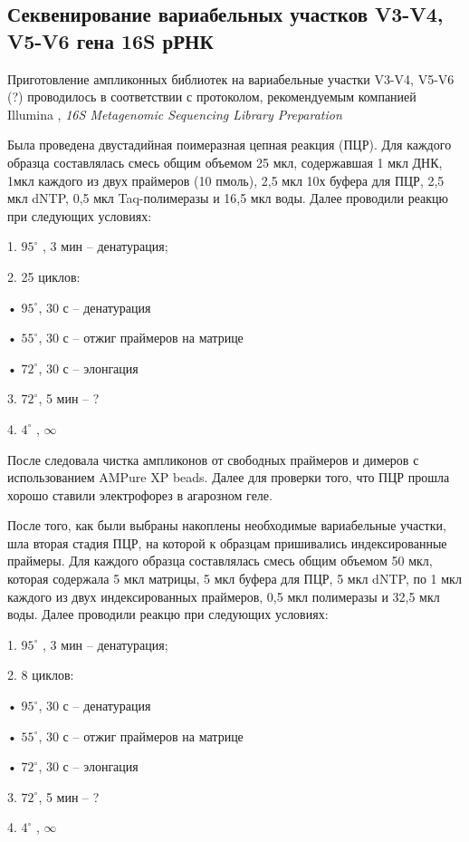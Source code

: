 \subsection{Секвенирование вариабельных участков V3-V4, V5-V6 гена 16S рРНК}  \label{subsect1_2_2}

Приготовление ампликонных библиотек на вариабельные участки V3-V4, V5-V6 (?) проводилось  в соответствии с протоколом, рекомендуемым компанией Illumina , \textit{16S Metagenomic Sequencing Library Preparation }

Была проведена  двустадийная поимеразная цепная реакция (ПЦР). Для каждого образца составлялась смесь общим объемом 25 мкл, содержавшая 1 мкл ДНК, 1мкл каждого из двух праймеров (10 пмоль), 2,5 мкл 10х буфера для ПЦР, 2,5 мкл dNTP, 0,5 мкл  Taq-полимеразы и 16,5 мкл воды. Далее проводили реакцю при следующих условиях:

1.	$95^{\circ}$ , 3 мин – денатурация;

2.	25 циклов:

•	$95^{\circ}$, 30 с – денатурация

•	$55^{\circ}$, 30 с – отжиг праймеров на матрице

•	$72^{\circ}$, 30 с – элонгация

3.	$72^{\circ}$, 5 мин – ?

4.  $4^{\circ}$ ,  $\infty$

После следовала чистка ампликонов от свободных праймеров и димеров с использованием AMPure XP beads. Далее для проверки того, что ПЦР прошла хорошо ставили электрофорез в агарозном геле. 

После того, как были выбраны накоплены необходимые вариабельные участки, шла вторая стадия ПЦР, на которой к образцам пришивались индексированные праймеры.  Для каждого образца составлялась смесь общим объемом 50 мкл, которая содержала 5 мкл матрицы, 5 мкл буфера для ПЦР, 5 мкл dNTP, по 1 мкл каждого из двух индексированных праймеров, 0,5 мкл полимеразы и 32,5 мкл воды. Далее проводили реакцю при следующих условиях:

1.	$95^{\circ}$ , 3 мин – денатурация;

2.	8 циклов:

•	$95^{\circ}$, 30 с – денатурация

•	$55^{\circ}$, 30 с – отжиг праймеров на матрице

•	$72^{\circ}$, 30 с – элонгация

3.	$72^{\circ}$, 5 мин – ?

4.  $4^{\circ}$ ,  $\infty$

